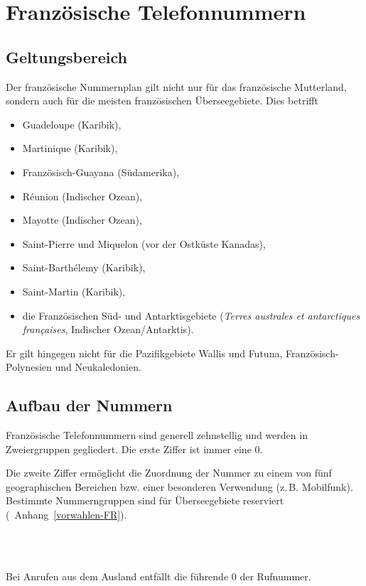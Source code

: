 \documentclass[numbers=noenddot]{scrreprt}
\newcommand\Abschnittsliteratur[1]{\bgroup
\small
\raggedright
\printbibliography[heading=subbibnumbered,keyword=#1]
\egroup}
\newcommand\UeberschriftGeltungsbereich{\section{Geltungsbereich}}
\newcommand\UeberschriftAufbau{\section{Aufbau der Nummern}}
\newcommand*\vglAnhang[1]{(\cf\ Anhang~\ref{#1})}
\begin{document}
\Abschnittsliteratur{austrian}

\chapter{Französische Telefonnummern}
\UeberschriftGeltungsbereich \label{FR-bereich}
Der französische Nummernplan
\cite{ARCEP}
gilt nicht nur für das französische Mutterland, sondern auch für die meisten französischen Überseegebiete. Dies betrifft
\begin{itemize}
\item Guadeloupe (Karibik),
\item Martinique (Karibik),
\item Französisch-Guayana (Südamerika),
\item R\'eunion (Indischer Ozean),
\item Mayotte (Indischer Ozean),
\item Saint-Pierre und Miquelon (vor der Ostküste Kanadas),
\item Saint-Barth\'elemy (Karibik),
\item Saint-Martin (Karibik),
\item die Französischen Süd- und Antarktisgebiete (\emph{\foreignlanguage{french}{Terres australes et antarctiques françaises}}, Indischer Ozean/Antarktis).
\end{itemize}
Er gilt hingegen nicht für die Pazifikgebiete Wallis und Futuna, Französisch-Polynesien und Neukaledonien.

\UeberschriftAufbau
Französische Telefonnummern sind generell zehnstellig und werden in Zweiergruppen gegliedert. Die erste Ziffer ist immer eine 0.
\begin{sidebyside}
\end{sidebyside}
Die zweite Ziffer ermöglicht die Zuordnung der Nummer zu einem von fünf geographischen Bereichen bzw. einer besonderen Verwendung (z.\,B. Mobilfunk). Bestimmte Nummerngruppen sind für Überseegebiete reserviert
\vglAnhang{vorwahlen-FR}.
\begin{sidebyside}
   \\
   \\
\end{sidebyside}

Bei Anrufen aus dem Ausland entfällt die führende 0 der Rufnummer.
\begin{sidebyside}
\end{sidebyside}
\end{document}
